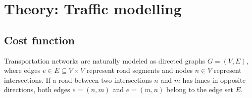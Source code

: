 \documentclass[twocolumn,english,groupedaddress, superscriptaddress,aps,pre,10pt,floatfix]{revtex4-2}
\begin{document}
%




\section{Theory: Traffic modelling}\label{sec:model}

\subsection{Cost function}

Transportation networks are naturally modeled as directed graphs $G = (V,E)$, where edges $e \in E \subseteq V \times V$ represent road segments and nodes $n \in V$ represent intersections.
If a road between two intersections $n$ and $m$ has lanes in opposite directions, both edges $e=(n,m)$ and $e=(m,n)$ belong to the edge set $E$.\\

\end{document}
